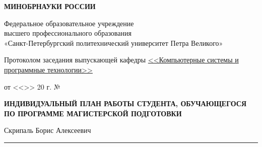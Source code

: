 \begin{center}

\textbf{МИНОБРНАУКИ РОССИИ}

\vspace{1em}
Федеральное образовательное учреждение\\
высшего профессионального образования\\
«Санкт-Петербургский политехнический университет Петра Великого»

\end{center}

\vspace{1em}

\begin{multicols}{2}

    \phantom{foo}

    \columnbreak


    \begin{flushleft}
        Протоколом заседания выпускающей кафедры
        \uline{<<Компьютерные системы и программные технологии>> \hfill}

        \vspace{1em}

        от <<\uline{\hphantom{200}}>> \uline{\hphantom{декабрььььь}}
        20\uline{\hphantom{130}} г. № \uline{\hphantom{1300}}
    \end{flushleft}
\end{multicols}

\vspace{15pt}

\begin{center}
    \textbf{ИНДИВИДУАЛЬНЫЙ ПЛАН РАБОТЫ СТУДЕНТА, ОБУЧАЮЩЕГОСЯ ПО ПРОГРАММЕ
    МАГИСТЕРСКОЙ ПОДГОТОВКИ}

    \vspace{1em}

    Скрипаль Борис Алексеевич\hrule
\end{center}

